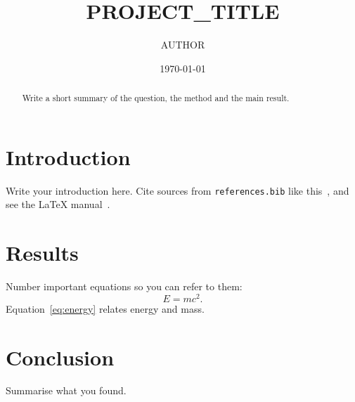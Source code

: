 \documentclass[aps,prl,reprint,superscriptaddress]{revtex4-2}
\begin{document}
\title{{{PROJECT_TITLE}}}
\author{{{AUTHOR}}}
\date{\today}

\begin{abstract}
Write a short summary of the question, the method and the main result.
\end{abstract}

\maketitle

\section{Introduction}
Write your introduction here. Cite sources from \texttt{references.bib} like
this~\cite{einstein1905}, and see the \LaTeX{} manual~\cite{lamport1994}.

\section{Results}
Number important equations so you can refer to them:
\begin{equation}
  E = mc^2 . \label{eq:energy}
\end{equation}
Equation~\eqref{eq:energy} relates energy and mass.

\section{Conclusion}
Summarise what you found.


\end{document}

